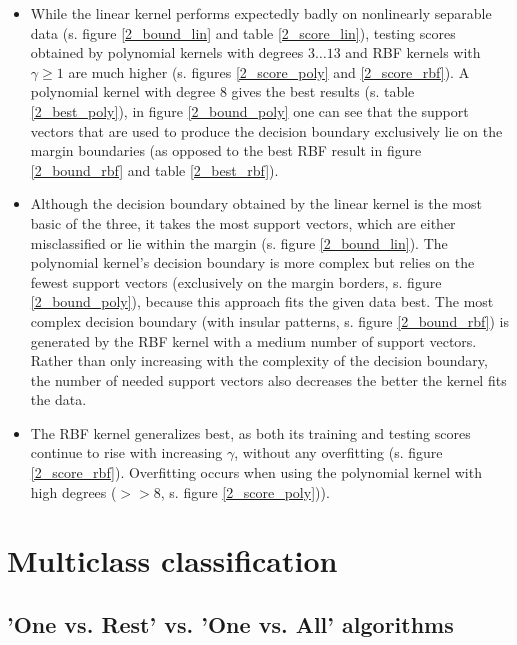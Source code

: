 \documentclass{article}
\begin{document}
\begin{itemize}
\item While the linear kernel performs expectedly badly on nonlinearly separable data (s. figure \ref{2_bound_lin} and table \ref{2_score_lin}), testing scores obtained by polynomial kernels with degrees $3 \dots 13$ and RBF kernels with $\gamma \geq 1 $ are much higher (s. figures \ref{2_score_poly} and \ref{2_score_rbf}). A polynomial kernel with degree $8$ gives the best results (s. table \ref{2_best_poly}), in figure \ref{2_bound_poly} one can see that the support vectors that are used to produce the decision boundary exclusively lie on the margin boundaries (as opposed to the best RBF result in figure \ref{2_bound_rbf} and table \ref{2_best_rbf}).

\item Although the decision boundary obtained by the linear kernel is the most basic of the three, it takes the most support vectors, which are either misclassified or lie within the margin (s. figure \ref{2_bound_lin}). The polynomial kernel's decision boundary is more complex but relies on the fewest support vectors (exclusively on the margin borders, s. figure \ref{2_bound_poly}), because this approach fits the given data best. The most complex decision boundary (with insular patterns, s. figure \ref{2_bound_rbf}) is generated by the RBF kernel with a medium number of support vectors. Rather than only increasing with the complexity of the decision boundary, the number of needed support vectors also decreases the better the kernel fits the data.

\item The RBF kernel generalizes best, as both its training and testing scores continue to rise with increasing $\gamma$, without any overfitting (s. figure \ref{2_score_rbf}). Overfitting occurs when using the polynomial kernel with high degrees ($>>8$, s. figure \ref{2_score_poly})).

\end{itemize}

\clearpage
\section{Multiclass classification}

\subsection{'One vs. Rest' vs. 'One vs. All' algorithms}
\end{document}
